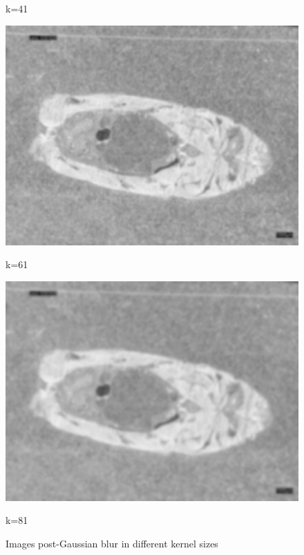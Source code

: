 \begin{figure}
\begin{minipage}{0.24\textwidth}
        \caption*{k=41}
    \end{minipage}
    \begin{minipage}{0.24\textwidth}
        \centering
        \includegraphics[width=\textwidth]{./fig/gausssian/blurred61.jpg}
        \caption*{k=61}
    \end{minipage}
    \begin{minipage}{0.24\textwidth}
        \centering
        \includegraphics[width=\textwidth]{./fig/gausssian/blurred81.jpg}
        \caption*{k=81}
    \end{minipage}
    \caption{Images post-Gaussian blur in different kernel sizes}
    \label{fig:blurred}
\end{figure}


